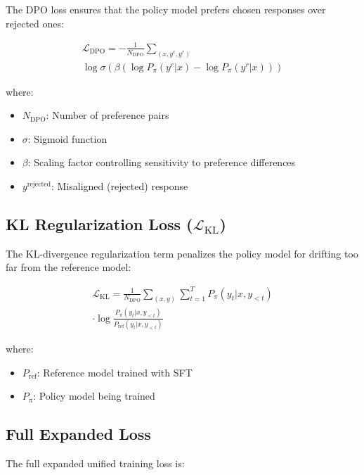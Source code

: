 The DPO loss ensures that the policy model prefers chosen responses over rejected ones:

\begin{multline}
\mathcal{L}_{\text{DPO}} = -\frac{1}{N_{\text{DPO}}} \sum_{(x, y^{c}, y^{r})} \\
\log \sigma\left(\beta \left(\log P_\pi(y^{c}|x) - \log P_\pi(y^{r}|x)\right)\right)
\label{eq:dpo_full}
\end{multline}

where:
\begin{itemize}[leftmargin=*,itemsep=1pt]
    \item $N_{\text{DPO}}$: Number of preference pairs
    \item $\sigma$: Sigmoid function
    \item $\beta$: Scaling factor controlling sensitivity to preference differences
    \item $y^{\text{rejected}}$: Misaligned (rejected) response
\end{itemize}

\subsection{KL Regularization Loss ($\mathcal{L}_{\text{KL}}$)}

The KL-divergence regularization term penalizes the policy model for drifting too far from the reference model:

\begin{multline}
\mathcal{L}_{\text{KL}} = \frac{1}{N_{\text{DPO}}} \sum_{(x,y)} \sum_{t=1}^{T} P_\pi(y_t|x, y_{<t}) \\
\cdot \log \frac{P_\pi(y_t|x, y_{<t})}{P_{\text{ref}}(y_t|x, y_{<t})}
\label{eq:kl_full}
\end{multline}

where:
\begin{itemize}[leftmargin=*,itemsep=1pt]
    \item $P_{\text{ref}}$: Reference model trained with SFT
    \item $P_\pi$: Policy model being trained
\end{itemize}

\subsection{Full Expanded Loss}

The full expanded unified training loss is:

